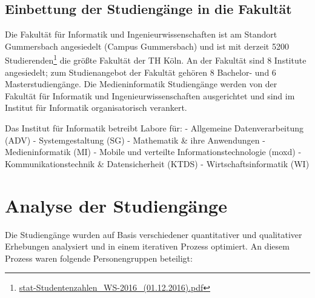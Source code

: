 \section{Einbettung der Studiengänge in die
Fakultät}\label{einbettung-der-studienguxe4nge-in-die-fakultuxe4t}

Die Fakultät für Informatik und Ingenieurwissenschaften ist am Standort
Gummersbach angesiedelt (Campus Gummersbach) und ist mit derzeit 5200
Studierenden\footnote{\href{../anhaenge/stat-Studentenzahlen_WS-2016_(01.12.2016).pdf}{stat-Studentenzahlen\_WS-2016\_(01.12.2016).pdf}}
die größte Fakultät der TH Köln. An der Fakultät sind 8 Institute
angesiedelt; zum Studienangebot der Fakultät gehören 8 Bachelor- und 6
Masterstudiengänge. Die Medieninformatik Studiengänge werden von der
Fakultät für Informatik und Ingenieurwissenschaften ausgerichtet und
sind im Institut für Informatik organisatorisch verankert.

Das Institut für Informatik betreibt Labore für: - Allgemeine
Datenverarbeitung (ADV) - Systemgestaltung (SG) - Mathematik \& ihre
Anwendungen - Medieninformatik (MI) - Mobile und verteilte
Informationstechnologie (moxd) - Kommunikationstechnik \&
Datensicherheit (KTDS) - Wirtschaftsinformatik (WI)

\chapter{Analyse der Studiengänge}\label{analyse-der-studienguxe4nge}

Die Studiengänge wurden auf Basis verschiedener quantitativer und
qualitativer Erhebungen analysiert und in einem iterativen Prozess
optimiert. An diesem Prozess waren folgende Personengruppen beteiligt:

